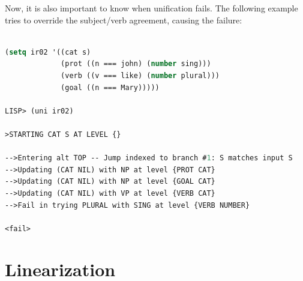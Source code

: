 \documentclass[10pt,a4paper]{report}
\begin{document}
Now, it is also important to know when unification fails. The
following example tries to override the subject/verb agreement,
causing the failure:
 

\begin{lstlisting}[language=Lisp]

(setq ir02 '((cat s) 
             (prot ((n === john) (number sing)))
             (verb ((v === like) (number plural))) 
             (goal ((n === Mary)))))

LISP> (uni ir02)

>STARTING CAT S AT LEVEL {}

-->Entering alt TOP -- Jump indexed to branch #1: S matches input S
-->Updating (CAT NIL) with NP at level {PROT CAT}
-->Updating (CAT NIL) with NP at level {GOAL CAT}
-->Updating (CAT NIL) with VP at level {VERB CAT}
-->Fail in trying PLURAL with SING at level {VERB NUMBER}

<fail>
\end{lstlisting}


\section{Linearization}
\end{document}
